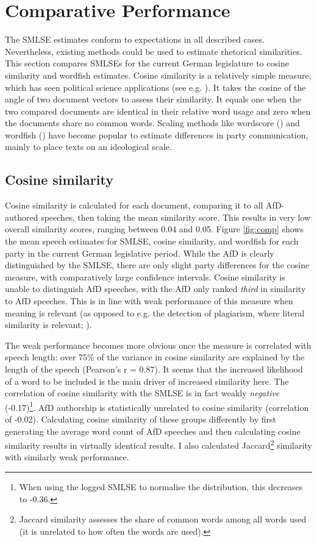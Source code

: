 \documentclass{article}
\begin{document}
\section{Comparative Performance}
The SMLSE estimates conform to expectations in all described cases. Nevertheless, existing methods could be used to estimate rhetorical similarities. This section compares SMLSEs for the current German legislature to cosine similarity and wordfish estimates. Cosine similarity is a relatively simple measure, which has seen political science applications (see e.g. \cite{Similarity2007a, Hager2020}). It takes the cosine of the angle of two document vectors to assess their similarity. It equals one when the two compared documents are identical in their relative word usage and zero when the documents share no common words. Scaling methods like wordscore (\cite{Laver2003}) and wordfish (\cite{Slapin2008}) have become popular to estimate differences in party communication, mainly to place texts on an ideological scale. \par

\subsection{Cosine similarity}

Cosine similarity is calculated for each document, comparing it to all AfD-authored speeches, then taking the mean similarity score. This results in very low overall similarity scores, ranging between 0.04 and 0.05. Figure \ref{fig:comp} shows the mean speech estimates for SMLSE, cosine similarity, and wordfish for each party in the current German legislative period. While the AfD is clearly distinguished by the SMLSE, there are only slight party differences for the cosine measure, with comparatively large confidence intervals. Cosine similarity is unable to distinguish AfD speeches, with the AfD only ranked \textit{third} in similarity to AfD speeches. This is in line with weak performance of this measure when meaning is relevant (as opposed to e.g. the detection of plagiarism, where literal similarity is relevant; \cite{Prasetya2018}).\par

The weak performance becomes more obvious once the measure is correlated with speech length: over 75\% of the variance in cosine similarity are explained by the length of the speech (Pearson's r = 0.87). It seems that the increased likelihood of a word to be included is the main driver of increased similarity here. The correlation of cosine similarity with the SMLSE is in fact weakly \textit{negative} (-0.17)\footnote{When using the logged SMLSE to normalise the distribution, this decreases to -0.36.}. AfD authorship is statistically unrelated to cosine similarity (correlation of -0.02). Calculating cosine similarity of these groups differently by first generating the average word count of AfD speeches and then calculating cosine similarity results in virtually identical results. I also calculated Jaccard\footnote{Jaccard similarity assesses the share of common words among all words used (it is unrelated to how often the words are used).} similarity with similarly weak performance.\par
\end{document}
